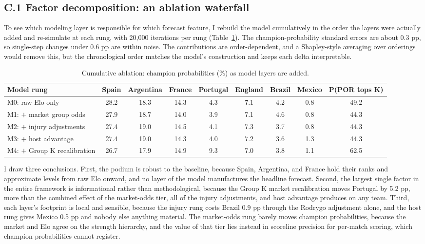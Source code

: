 \documentclass[11pt,a4paper]{article}
\begin{document}
\subsection*{C.1 \quad Factor decomposition: an ablation waterfall}

To see which modeling layer is responsible for which forecast feature, I rebuild the model cumulatively in the order the layers were actually added and re-simulate at each rung, with 20{,}000 iterations per rung (Table~\ref{tab:ablation}). The champion-probability standard errors are about 0.3 pp, so single-step changes under 0.6 pp are within noise. The contributions are order-dependent, and a Shapley-style averaging over orderings would remove this, but the chronological order matches the model's construction and keeps each delta interpretable.

\begin{table}[ht]
\centering\small
\caption{Cumulative ablation: champion probabilities (\%) as model layers are added.}
\label{tab:ablation}
\begin{tabular}{lcccccccc}
\toprule
Model rung & Spain & Argentina & France & Portugal & England & Brazil & Mexico & P(POR tops K) \\
\midrule
M0: raw Elo only          & 28.2 & 18.3 & 14.3 & 4.3 & 7.1 & 4.2 & 0.8 & 49.2 \\
M1: $+$ market group odds & 27.9 & 18.7 & 14.0 & 3.9 & 7.1 & 4.6 & 0.8 & 44.3 \\
M2: $+$ injury adjustments& 27.4 & 19.0 & 14.5 & 4.1 & 7.3 & 3.7 & 0.8 & 44.3 \\
M3: $+$ host advantage    & 27.4 & 19.0 & 14.3 & 4.0 & 7.2 & 3.6 & 1.3 & 44.3 \\
M4: $+$ Group K recalibration & 26.7 & 17.9 & 14.9 & 9.3 & 7.0 & 3.8 & 1.1 & 62.5 \\
\bottomrule
\end{tabular}
\end{table}

I draw three conclusions. First, the podium is robust to the baseline, because Spain, Argentina, and France hold their ranks and approximate levels from raw Elo onward, and no layer of the model manufactures the headline forecast. Second, the largest single factor in the entire framework is informational rather than methodological, because the Group K market recalibration moves Portugal by 5.2 pp, more than the combined effect of the market-odds tier, all of the injury adjustments, and host advantage produces on any team. Third, each layer's footprint is local and sensible, because the injury rung costs Brazil 0.9 pp through the Rodrygo adjustment alone, and the host rung gives Mexico 0.5 pp and nobody else anything material. The market-odds rung barely moves champion probabilities, because the market and Elo agree on the strength hierarchy, and the value of that tier lies instead in scoreline precision for per-match scoring, which champion probabilities cannot register.
\end{document}
